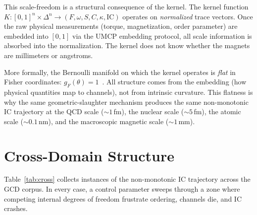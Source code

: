 \documentclass[
  aps,
  prd,
  twocolumn,
  superscriptaddress,
  nofootinbib,
  floatfix
]{revtex4-2}
\newcommand{\IC}{\mathrm{IC}}
\newcommand{\gF}{g_{\!F}}
\begin{document}
This scale-freedom is a structural consequence of the
kernel.  The kernel function $K: [0,1]^n \times \Delta^n
\to (F, \omega, S, C, \kappa, \IC)$ operates on
\emph{normalized} trace vectors.  Once the raw physical
measurements (torque, magnetization, order parameter) are
embedded into $[0,1]$ via the UMCP embedding protocol,
all scale information is absorbed into the normalization.
The kernel does not know whether the magnets are
millimeters or angstroms.

More formally, the Bernoulli manifold on which the kernel
operates is \emph{flat} in Fisher coordinates:
$\gF(\theta) = 1$~\cite{paulus2025physicscoherence}.
All structure comes from the embedding (how physical
quantities map to channels), not from intrinsic curvature.
This flatness is why the same geometric-slaughter mechanism
produces the same non-monotonic IC trajectory at
the QCD scale ($\sim 1$\,fm), the nuclear scale
($\sim 5$\,fm), the atomic scale ($\sim 0.1$\,nm),
and the macroscopic magnetic scale ($\sim 1$\,mm).

\section{Cross-Domain Structure}\label{sec:cross}

Table~\ref{tab:cross} collects instances of the
non-monotonic IC trajectory across the GCD corpus.
In every case, a control parameter sweeps through
a zone where competing internal degrees of freedom
frustrate ordering, channels die, and IC crashes.
\end{document}
